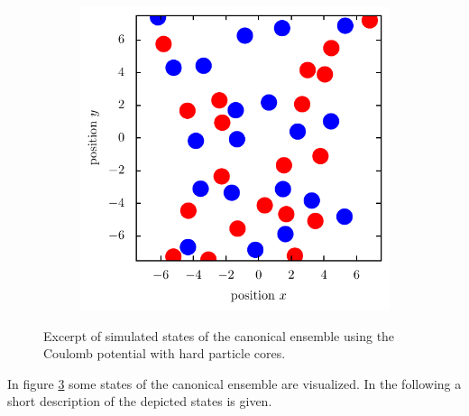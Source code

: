 \documentclass[11pt, a4paper]{article}
\numberwithin{equation}{section}
\begin{document}
\begin{figure}[hp]
\begin{subfigure}[t]{0.48\textwidth}
		\label{fig:coulomb_molecular}
		\vspace*{0.3cm}
	\end{subfigure}
	\centering
	\begin{subfigure}[t]{0.48\textwidth}
		\centering
		\includegraphics[width=\textwidth]{figures/Plasma_1_beta_2.pdf}
		\label{fig:coulomb_ion}
		\vspace*{0.3cm}
	\end{subfigure}
	\caption{Excerpt of simulated states of the canonical ensemble using the Coulomb potential with hard particle cores.}
	\label{fig:coulomb_vis}
\end{figure}
In figure \ref{fig:coulomb_vis} some states of the canonical ensemble are visualized.
In the following a short description of the depicted states is given.
\end{document}

